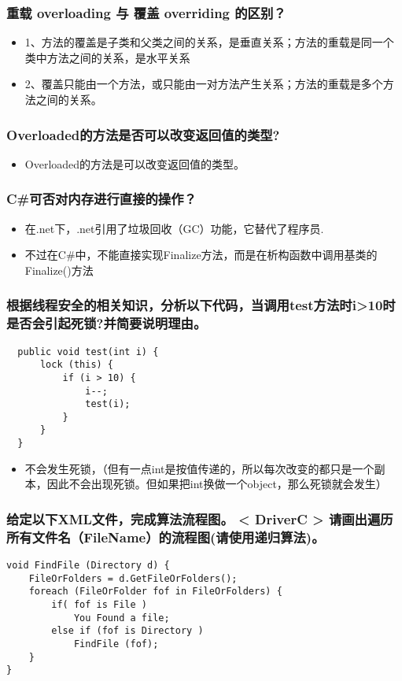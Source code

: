 \documentclass[9pt, b5paper]{article}
\begin{document}
\subsubsection{重载 overloading 与 覆盖 overriding 的区别？}
\label{sec-1-1-101}
\begin{itemize}
\item 1、方法的覆盖是子类和父类之间的关系，是垂直关系；方法的重载是同一个类中方法之间的关系，是水平关系
\item 2、覆盖只能由一个方法，或只能由一对方法产生关系；方法的重载是多个方法之间的关系。
\end{itemize}
\subsubsection{Overloaded的方法是否可以改变返回值的类型?}
\label{sec-1-1-102}
\begin{itemize}
\item Overloaded的方法是可以改变返回值的类型。
\end{itemize}
\subsubsection{C\#可否对内存进行直接的操作？}
\label{sec-1-1-103}
\begin{itemize}
\item 在.net下，.net引用了垃圾回收（GC）功能，它替代了程序员.
\item 不过在C\#中，不能直接实现Finalize方法，而是在析构函数中调用基类的Finalize()方法
\end{itemize}
\subsubsection{根据线程安全的相关知识，分析以下代码，当调用test方法时i>10时是否会引起死锁?并简要说明理由。}
\label{sec-1-1-104}
\begin{verbatim}
  public void test(int i) {
      lock (this) {
          if (i > 10) {
              i--;
              test(i);
          }
      }
  }
\end{verbatim}
\begin{itemize}
\item 不会发生死锁，（但有一点int是按值传递的，所以每次改变的都只是一个副本，因此不会出现死锁。但如果把int换做一个object，那么死锁就会发生）
\end{itemize}
\subsubsection{给定以下XML文件，完成算法流程图。 < DriverC > 请画出遍历所有文件名（FileName）的流程图(请使用递归算法)。}
\label{sec-1-1-105}
\begin{verbatim}
void FindFile (Directory d) {
    FileOrFolders = d.GetFileOrFolders();
    foreach (FileOrFolder fof in FileOrFolders) {
        if( fof is File )
            You Found a file;
        else if (fof is Directory )
            FindFile (fof);
    }
}
\end{verbatim}
\end{document}
